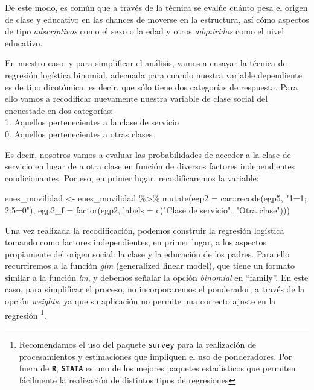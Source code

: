 \documentclass[
]{book}
\newenvironment{Shaded}{\begin{snugshade}}{\end{snugshade}}
\newcommand{\AttributeTok}[1]{\textcolor[rgb]{0.77,0.63,0.00}{#1}}
\newcommand{\FunctionTok}[1]{\textcolor[rgb]{0.00,0.00,0.00}{#1}}
\newcommand{\NormalTok}[1]{#1}
\newcommand{\OtherTok}[1]{\textcolor[rgb]{0.56,0.35,0.01}{#1}}
\newcommand{\SpecialCharTok}[1]{\textcolor[rgb]{0.00,0.00,0.00}{#1}}
\newcommand{\StringTok}[1]{\textcolor[rgb]{0.31,0.60,0.02}{#1}}
\begin{document}
De este modo, es común que a través de la técnica se evalúe cuánto pesa el origen de clase y educativo en las chances de moverse en la estructura, así cómo aspectos de tipo \emph{adscriptivos} como el sexo o la edad y otros \emph{adquiridos} como el nivel educativo.

En nuestro caso, y para simplificar el análisis, vamos a ensayar la técnica de regresión logística binomial, adecuada para cuando nuestra variable dependiente es de tipo dicotómica, es decir, que sólo tiene dos categorías de respuesta. Para ello vamos a recodificar nuevamente nuestra variable de clase social del encuestade en dos categorías:\\
1. Aquellos pertenecientes a la clase de servicio\\
0. Aquellos pertenecientes a otras clases

Es decir, nosotros vamos a evaluar las probabilidades de acceder a la clase de servicio en lugar de a otra clase en función de diversos factores independientes condicionantes. Por eso, en primer lugar, recodificaremos la variable:

\begin{Shaded}
\begin{Highlighting}[]
\NormalTok{enes\_movilidad }\OtherTok{\textless{}{-}}\NormalTok{ enes\_movilidad }\SpecialCharTok{\%\textgreater{}\%} 
    \FunctionTok{mutate}\NormalTok{(}\AttributeTok{egp2 =}\NormalTok{ car}\SpecialCharTok{::}\FunctionTok{recode}\NormalTok{(egp5, }\StringTok{"1=1; 2:5=0"}\NormalTok{),}
                 \AttributeTok{egp2\_f =} \FunctionTok{factor}\NormalTok{(egp2, }\AttributeTok{labels =} \FunctionTok{c}\NormalTok{(}\StringTok{"Clase de servicio"}\NormalTok{, }\StringTok{"Otra clase"}\NormalTok{)))}
\end{Highlighting}
\end{Shaded}

Una vez realizada la recodificación, podemos construir la regresión logística tomando como factores independientes, en primer lugar, a los aspectos propiamente del origen social: la clase y la educación de los padres. Para ello recurriremos a la función \emph{glm} (generalized linear model), que tiene un formato similar a la función \emph{lm}, y debemos señalar la opción \emph{binomial} en ``family''. En este caso, para simplificar el proceso, no incorporaremos el ponderador, a través de la opción \emph{weights}, ya que su aplicación no permite una correcto ajuste en la regresión \footnote{Recomendamos el uso del paquete \texttt{survey} para la realización de procesamientos y estimaciones que impliquen el uso de ponderadores. Por fuera de \textbf{\texttt{R}}, \textbf{\texttt{STATA}} es uno de los mejores paquetes estadísticos que permiten fácilmente la realización de distintos tipos de regresiones}.
\end{document}
